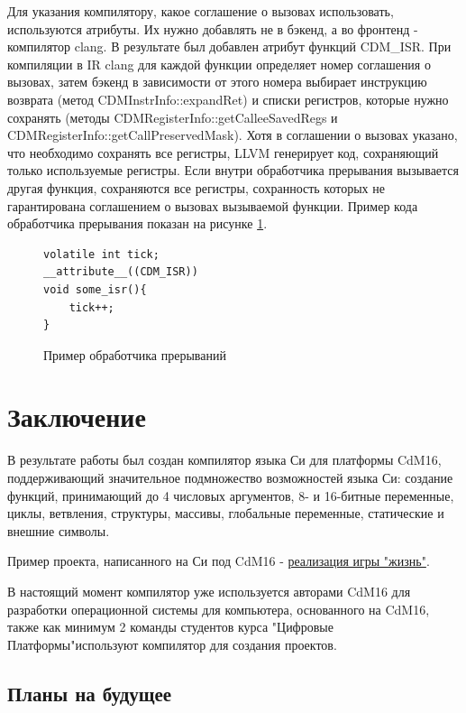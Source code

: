 \documentclass[a4paper,14pt]{extarticle}
\begin{document}
Для указания компилятору, какое соглашение о вызовах использовать, используются атрибуты. Их нужно добавлять не в бэкенд, а во фронтенд - компилятор clang. В результате был добавлен атрибут функций CDM\_ISR. При компиляции в IR clang для каждой функции определяет номер соглашения о вызовах, затем бэкенд в зависимости от этого номера выбирает инструкцию возврата (метод CDMInstrInfo::expandRet) и списки регистров, которые нужно сохранять (методы CDMRegisterInfo::getCalleeSavedRegs и\\ CDMRegisterInfo::getCallPreservedMask). Хотя в соглашении о вызовах указано, что необходимо сохранять все регистры, LLVM генерирует код, сохраняющий только используемые регистры. Если внутри обработчика прерывания вызывается другая функция, сохраняются все регистры, сохранность которых не гарантирована соглашением о вызовах вызываемой функции. Пример кода обработчика прерывания показан на рисунке \ref{ISR-example}.
\begin{figure}[h!]
	\begin{verbatim}
volatile int tick;
__attribute__((CDM_ISR))
void some_isr(){
	tick++;
}
	\end{verbatim}
	\caption{Пример обработчика прерываний}
	\label{ISR-example}
\end{figure}

\clearpage
\section{Заключение}

В результате работы был создан компилятор языка Си для платформы CdM16, поддерживающий значительное подмножество возможностей языка Си: создание функций, принимающий до 4 числовых аргументов, 8- и 16-битные переменные, циклы, ветвления, структуры, массивы, глобальные переменные, статические и внешние символы.

Пример проекта, написанного на Си под CdM16 - \href{https://github.com/leadpogrommer/llvm-project-cdm/tree/backend/cdm/llvm/test_cdm/life_multifile}{реализация игры "жизнь"}.

В настоящий момент компилятор уже используется авторами CdM16 для разработки операционной системы для компьютера, основанного на CdM16\cite{cdm:coconut}, также как минимум 2 команды студентов курса "Цифровые Платформы"\allowbreak используют компилятор для создания проектов.

\subsection{Планы на будущее}
\end{document}
